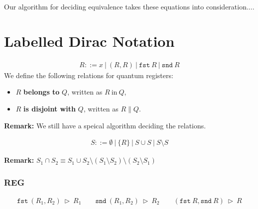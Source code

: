 \documentclass[manuscript, review, timestamp]{acmart}
\newcommand*{\fst}{\texttt{fst}}
\newcommand*{\snd}{\texttt{snd}}
\newcommand*{\reduce}{\ \triangleright\ }
\begin{document}
Our algorithm for deciding equivalence takes these equations into consideration....


\section{Labelled Dirac Notation}

\begin{definition}
  \begin{align*}
    R ::= x\ |\ (R, R)\ |\ \fst\ R\ |\ \snd\ R
  \end{align*}
  We define the following relations for quantum registers:
  \begin{itemize}
    \item $R$ \textbf{belongs to} $Q$, written as $R\ \text{in}\ Q$,
    \item $R$ \textbf{is disjoint with} $Q$, written as $R \| Q$.
  \end{itemize}
\end{definition}

\textbf{Remark:} We still have a speical algorithm deciding the relations.

\begin{definition}
  \begin{align*}
    S ::= \emptyset\ |\ \{ R \} \ |\ S \cup S\ |\ S \setminus S
  \end{align*}
\end{definition}

\textbf{Remark: } $ S_1 \cap S_2 \equiv S_1 \cup S_2 \setminus (S_1 \setminus S_2) \setminus (S_2 \setminus S_1) $

\subsubsection*{\textsf{REG}}
\begin{gather*}
  \fst\ (R_1, R_2) \reduce R_1 \qquad 
  \snd\ (R_1, R_2) \reduce R_2 \qquad
  (\fst\ R, \snd\ R) \reduce R
\end{gather*}
\end{document}
